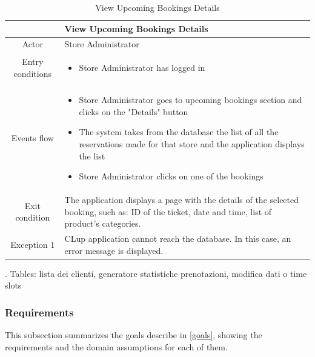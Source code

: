 \documentclass[table, 12pt]{article}
\begin{document}
\begin{longtable}{|c| p{10cm}|}
    \caption{View Upcoming Bookings Details}                                                                                                                             \\
    \hline
                     & View Upcoming Bookings Details                                                                                                                    \\
    \hline
    Actor            & Store Administrator                                                                                                                               \\
    \hline
    Entry conditions & \begin{itemize}
        \item Store Administrator has logged in
    \end{itemize}                                                                                                                        \\
    \hline
    Events flow      & \begin{itemize}[nosep,after=\strut]
        \item Store Administrator goes to upcoming bookings section and clicks on the "Details" button
        \item The system takes from the database the list of all the reservations made for that store and the application displays the list
        \item Store Administrator clicks on one of the bookings
    \end{itemize}                                                                                                                        \\
    \hline
    Exit condition   & The application displays a page with the details of the selected booking, such as: ID of the ticket, date and time, list of product's categories.
    \\
    \hline
    \hline
    Exception 1      & CLup application cannot reach the database. In this case, an error message is displayed.                                                          \\
    \hline
\end{longtable}


\todo . Tables: lista dei clienti, generatore statistiche prenotazioni, modifica dati o time slots

\subsubsection{Requirements}
This subsection summarizes the goals describe in \ref{goals}, showing the requirements and the domain assumptions for each of them.
\end{document}

